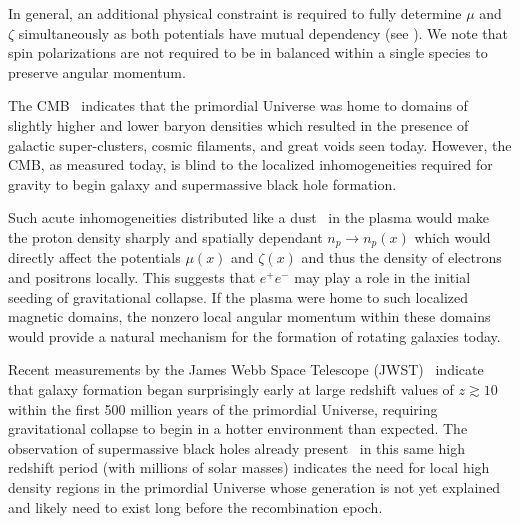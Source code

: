 \label{sec:inhomogeneous}
\noindent In general, an additional physical constraint is required to fully determine $\mu$ and $\zeta$ simultaneously as both potentials have mutual dependency (see ). We note that spin polarizations are not required to be in balanced within a single species to preserve angular momentum.

The CMB~\cite{Planck:2018vyg} indicates that the primordial Universe was home to domains of slightly higher and lower baryon densities which resulted in the presence of galactic super-clusters, cosmic filaments, and great voids seen today. However, the CMB, as measured today, is blind to the localized inhomogeneities required for gravity to begin galaxy and supermassive black hole formation.

Such acute inhomogeneities distributed like a dust~\cite{Grayson:2023flr} in the plasma would make the proton density sharply and spatially dependant $n_{p}\rightarrow n_{p}(x)$ which would directly affect the potentials $\mu(x)$ and $\zeta(x)$ and thus the density of electrons and positrons locally. This suggests that $e^{+}e^{-}$ may play a role in the initial seeding of gravitational collapse. If the plasma were home to such localized magnetic domains, the nonzero local angular momentum within these domains would provide a natural mechanism for the formation of rotating galaxies today.

Recent measurements by the James Webb Space Telescope (JWST)~\cite{Yan:2022sxd,adams2023discovery,arrabal2023spectroscopic} indicate that galaxy formation began surprisingly early at large redshift values of $z\gtrsim10$ within the first 500 million years of the primordial Universe, requiring gravitational collapse to begin in a hotter environment than expected. The observation of supermassive black holes already present~\cite{CEERSTeam:2023qgy} in this same high redshift period (with millions of solar masses) indicates the need for local high density regions in the primordial Universe whose generation is not yet explained and likely need to exist long before the recombination epoch.
